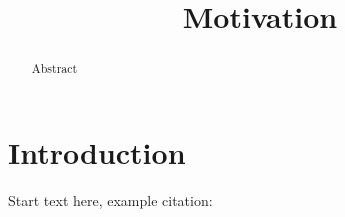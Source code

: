 \documentclass{iau_FM}
\title[Motivation] {Motivation}
\begin{document}
\maketitle

\begin{abstract}
Abstract
\end{abstract}


\section{Introduction}
Start text here, example citation: \citep{murthy21}





\end{document}
